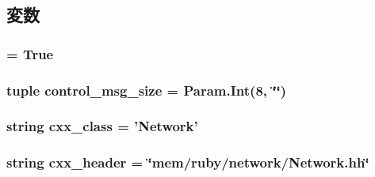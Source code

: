 \subsection{変数}
\hypertarget{classNetwork_1_1RubyNetwork_a17fa61ac3806b481cafee5593b55e5d0}{
\subsubsection[{abstract}]{ = True}}
\label{classNetwork_1_1RubyNetwork_a17fa61ac3806b481cafee5593b55e5d0}
\hypertarget{classNetwork_1_1RubyNetwork_a0c4df9bd1e470f6da39cbf1972b595d7}{
\subsubsection[{control\_\-msg\_\-size}]{\setlength{\rightskip}{0pt plus 5cm}tuple {\bf control\_\-msg\_\-size} = Param.Int(8, \char`\"{}\char`\"{})}}
\label{classNetwork_1_1RubyNetwork_a0c4df9bd1e470f6da39cbf1972b595d7}
\hypertarget{classNetwork_1_1RubyNetwork_a58cd55cd4023648e138237cfc0822ae3}{
\subsubsection[{cxx\_\-class}]{\setlength{\rightskip}{0pt plus 5cm}string {\bf cxx\_\-class} = '{\bf Network}'}}
\label{classNetwork_1_1RubyNetwork_a58cd55cd4023648e138237cfc0822ae3}
\hypertarget{classNetwork_1_1RubyNetwork_a17da7064bc5c518791f0c891eff05fda}{
\subsubsection[{cxx\_\-header}]{\setlength{\rightskip}{0pt plus 5cm}string {\bf cxx\_\-header} = \char`\"{}mem/ruby/network/Network.hh\char`\"{}}}
\label{classNetwork_1_1RubyNetwork_a17da7064bc5c518791f0c891eff05fda}


